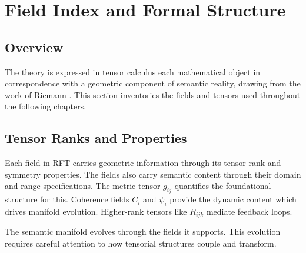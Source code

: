 \chapter{Field Index and Formal Structure}

\section{Overview}

The theory is expressed in tensor calculus each mathematical object in correspondence with a geometric component of semantic reality, drawing from the work of Riemann \autocite{Riemann1868}. This section inventories the fields and tensors used throughout the following chapters.

\section{Tensor Ranks and Properties}

Each field in RFT carries geometric information through its tensor rank and symmetry properties. The fields also carry semantic content through their domain and range specifications. The metric tensor \(g_{ij}\) quantifies the foundational structure for this. Coherence fields \(C_i\) and \(\psi_i\) provide the dynamic content which drives manifold evolution. Higher-rank tensors like \(R_{ijk}\) mediate feedback loops.

The semantic manifold evolves through the fields it supports. This evolution requires careful attention to how tensorial structures couple and transform.

